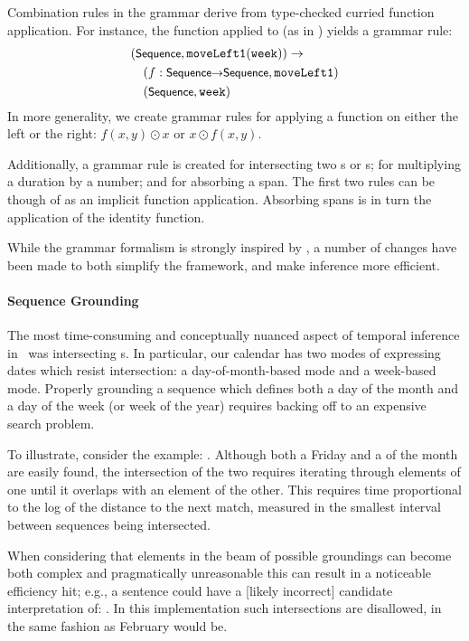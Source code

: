 Combination rules in the grammar derive from type-checked
  curried function application.
For instance, the function  applied
  to  (as in ) yields a grammar rule:
\begin{align*}
&  (\ty{Sequence}, \te{moveLeft1$($week$)$}) \rightarrow \\
&~~~(f:\ty{Sequence$\rightarrow$Sequence}, \te{moveLeft1}) \\
&~~~(\ty{Sequence}, \te{week})
\end{align*}
In more generality, we create grammar rules for applying a function
  on either the left or the right: $f(x,y) \odot x$ or $x \odot f(x,y)$.

Additionally, a grammar rule is created for intersecting two s or
  s; for multiplying a duration by a number; and for absorbing
  a  span.
The first two rules can be though of as an implicit function application.
Absorbing  spans is in turn the application of the identity function.

While the grammar formalism is strongly inspired by \me, a number of changes
  have been made to both simplify the framework, and make inference more
  efficient.

\paragraph{Sequence Grounding}
The most time-consuming and conceptually nuanced aspect of temporal inference
  in \me\ was intersecting s.
In particular, our calendar has two modes of expressing
  dates which resist intersection: a day-of-month-based mode and a
  week-based mode.
Properly grounding a sequence which defines both a day of the month and
  a day of the week (or week of the year) requires backing
  off to an expensive search problem.

To illustrate, consider the example: .
Although both a Friday and a  of the month are easily found, the
  intersection of the two requires iterating through elements of one until
  it overlaps with an element of the other.
This requires time proportional to the log of the distance to the next match,
  measured in the smallest interval between sequences being intersected.

When considering that elements in the beam of possible groundings can become
  both complex and pragmatically unreasonable this can result in a noticeable
  efficiency hit; e.g., a sentence could have a
  [likely incorrect] candidate interpretation of:
  .
In this implementation such intersections are disallowed, in the same fashion
  as February  would be.

